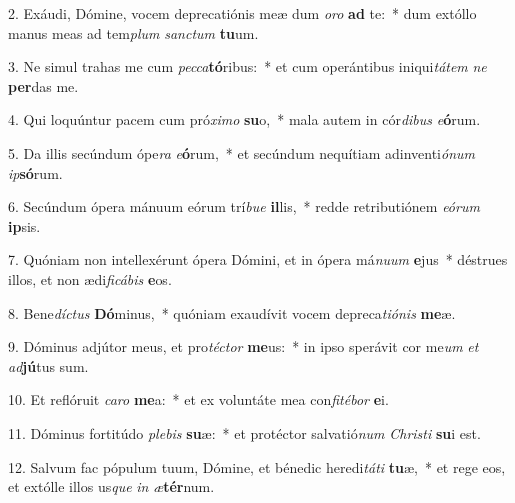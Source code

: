 2. Exáudi, Dómine, vocem deprecatiónis meæ dum \textit{o}\textit{ro} \textbf{ad} te:~*  dum extóllo manus meas ad tem\textit{plum} \textit{sanc}\textit{tum} \textbf{tu}um.\

3. Ne simul trahas me cum \textit{pec}\textit{ca}\textbf{tó}ribus:~*  et cum operántibus iniqui\textit{tá}\textit{tem} \textit{ne} \textbf{per}das me.\

4. Qui loquúntur pacem cum pró\textit{xi}\textit{mo} \textbf{su}o,~*  mala autem in cór\textit{di}\textit{bus} \textit{e}\textbf{ó}rum.\

5. Da illis secúndum ópe\textit{ra} \textit{e}\textbf{ó}rum,~*  et secúndum nequítiam adinventi\textit{ó}\textit{num} \textit{ip}\textbf{só}rum.\

6. Secúndum ópera mánuum eórum trí\textit{bu}\textit{e} \textbf{il}lis,~*  redde retributiónem \textit{e}\textit{ó}\textit{rum} \textbf{ip}sis.\

7. Quóniam non intellexérunt ópera Dómini, et in ópera má\textit{nu}\textit{um} \textbf{e}jus~*  déstrues illos, et non ædi\textit{fi}\textit{cá}\textit{bis} \textbf{e}os.\

8. Bene\textit{díc}\textit{tus} \textbf{Dó}minus,~*  quóniam exaudívit vocem depreca\textit{ti}\textit{ó}\textit{nis} \textbf{me}æ.\

9. Dóminus adjútor meus, et pro\textit{téc}\textit{tor} \textbf{me}us:~*  in ipso sperávit cor me\textit{um} \textit{et} \textit{ad}\textbf{jú}tus sum.\

10. Et reflóruit \textit{ca}\textit{ro} \textbf{me}a:~*  et ex voluntáte mea con\textit{fi}\textit{té}\textit{bor} \textbf{e}i.\

11. Dóminus fortitúdo \textit{ple}\textit{bis} \textbf{su}æ:~*  et protéctor salvatió\textit{num} \textit{Chris}\textit{ti} \textbf{su}i est.\

12. Salvum fac pópulum tuum, Dómine, et bénedic heredi\textit{tá}\textit{ti} \textbf{tu}æ,~*  et rege eos, et extólle illos us\textit{que} \textit{in} \textit{æ}\textbf{tér}num.\

